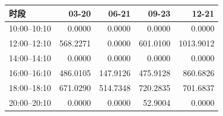 \begin{tabular}{lrrrr}
\toprule
时段 & 03-20 & 06-21 & 09-23 & 12-21 \\
\midrule
10:00--10:10 & 0.0000 & 0.0000 & 0.0000 & 0.0000 \\
12:00--12:10 & 568.2271 & 0.0000 & 601.0100 & 1013.9012 \\
14:00--14:10 & 0.0000 & 0.0000 & 0.0000 & 0.0000 \\
16:00--16:10 & 486.0105 & 147.9126 & 475.9128 & 860.6826 \\
18:00--18:10 & 671.0290 & 514.7348 & 720.2835 & 701.6837 \\
20:00--20:10 & 0.0000 & 0.0000 & 52.9004 & 0.0000 \\
\bottomrule
\end{tabular}